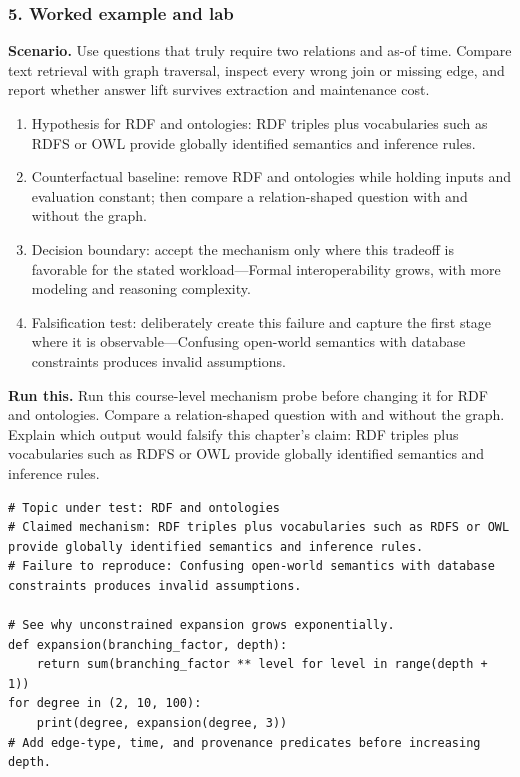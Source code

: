 \subsubsection*{5. Worked example and lab}
\textbf{Scenario.} Use questions that truly require two relations and as-of time. Compare text retrieval with graph traversal, inspect every wrong join or missing edge, and report whether answer lift survives extraction and maintenance cost.
\begin{enumerate}
\item Hypothesis for RDF and ontologies: RDF triples plus vocabularies such as RDFS or OWL provide globally identified semantics and inference rules.
\item Counterfactual baseline: remove RDF and ontologies while holding inputs and evaluation constant; then compare a relation-shaped question with and without the graph.
\item Decision boundary: accept the mechanism only where this tradeoff is favorable for the stated workload—Formal interoperability grows, with more modeling and reasoning complexity.
\item Falsification test: deliberately create this failure and capture the first stage where it is observable—Confusing open-world semantics with database constraints produces invalid assumptions.
\end{enumerate}
\textbf{Run this.} Run this course-level mechanism probe before changing it for RDF and ontologies. Compare a relation-shaped question with and without the graph. Explain which output would falsify this chapter's claim: RDF triples plus vocabularies such as RDFS or OWL provide globally identified semantics and inference rules.
\begin{Verbatim}[fontsize=\scriptsize]
# Topic under test: RDF and ontologies
# Claimed mechanism: RDF triples plus vocabularies such as RDFS or OWL provide globally identified semantics and inference rules.
# Failure to reproduce: Confusing open-world semantics with database constraints produces invalid assumptions.

# See why unconstrained expansion grows exponentially.
def expansion(branching_factor, depth):
    return sum(branching_factor ** level for level in range(depth + 1))
for degree in (2, 10, 100):
    print(degree, expansion(degree, 3))
# Add edge-type, time, and provenance predicates before increasing depth.
\end{Verbatim}
